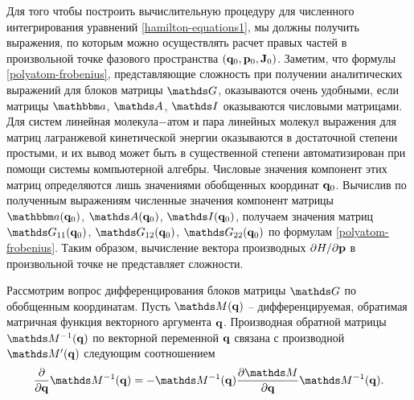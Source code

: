 Для того чтобы построить вычислительную процедуру для численного интегрирования уравнений \eqref{hamilton-equations1}, мы должны получить выражения, по которым можно осуществлять расчет правых частей в произвольной точке фазового пространства $\left( \mathbf{q}_0, \mathbf{p}_0, \mathbf{J}_0 \right)$. Заметим, что формулы \eqref{polyatom-frobenius}, представляющие сложность при получении аналитических выражений для блоков матрицы $\bbG$, оказываются очень удобными, если матрицы $\bba$, $\bbA$, $\bbI$ оказываются числовыми матрицами. Для систем линейная молекула$-$атом и пара линейных молекул выражения для матриц лагранжевой кинетической энергии оказываются в достаточной степени простыми, и их вывод может быть в существенной степени автоматизирован при помощи системы компьютерной алгебры. Числовые значения компонент этих матриц определяются лишь значениями обобщенных координат $\mathbf{q}_0$. Вычислив по полученным выражениям численные значения компонент матрицы $\bba(\mf{q}_0)$, $\bbA(\mf{q}_0)$, $\bbI(\mf{q}_0)$, получаем значения матриц $\bbG_{11}(\mf{q}_0)$, $\bbG_{12}(\mf{q}_0)$, $\bbG_{22}(\mf{q}_0)$ по формулам \eqref{polyatom-frobenius}. Таким образом, вычисление вектора производных $\partial H / \partial \mathbf{p}$ в произвольной точке не представляет сложности. \par
Рассмотрим вопрос дифференцирования блоков матрицы $\bbG$ по обобщенным координатам. Пусть $\bbM(\mf{q})$ -- дифференцируемая, обратимая матричная функция векторного аргумента $\mathbf{q}$. Производная обратной матрицы $\bbM^{-1}(\mf{q})$ по векторной переменной $\mathbf{q}$ связана с производной $\bbM^\prime(\mf{q})$ следующим соотношением \cite{matrixcookbook}
\begin{gather}
    \frac{\partial}{\partial \mf{q}} \bbM^{-1}(\mf{q}) = - \bbM^{-1}(\mf{q}) \frac{\partial \bbM}{\partial \mf{q}} \bbM^{-1}(\mf{q}).
\end{gather}

